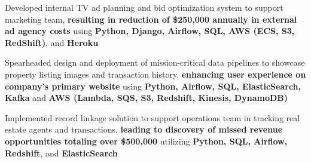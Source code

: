 \begin{cventries}
{\begin{cvitems}
        \item{Developed internal TV ad planning and bid optimization system to support marketing team, \textbf{resulting in reduction of \$250,000 annually in external ad agency costs} using \textbf{Python, Django, Airflow, SQL, AWS (ECS, S3, RedShift)}, and \textbf{Heroku}}
         \item{Spearheaded design and deployment of mission-critical data pipelines to showcase property listing images and transaction history, \textbf{enhancing user experience on company's primary website} using \textbf{Python, Airflow, SQL, ElasticSearch, Kafka} and \textbf{AWS (Lambda, SQS, S3, Redshift, Kinesis, DynamoDB)}}
         \item{Implemented record linkage solution to support operations team in tracking real estate agents and transactions, \textbf{leading to discovery of missed revenue opportunities totaling over \$500,000} utilizing \textbf{Python, SQL, Airflow, Redshift}, and \textbf{ElasticSearch}}

\end{cvitems}}
\end{cventries}
